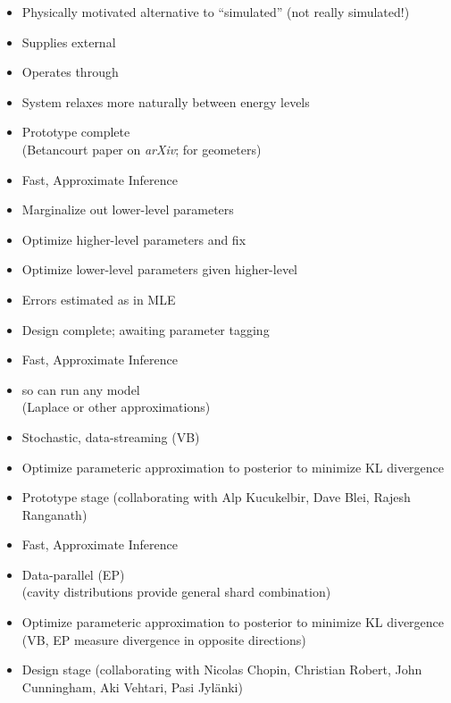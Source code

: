 \documentclass[10pt]{report}
\newcommand{\sld}[1]{\newpage{\noindent\LARGE \ \ \
    \textcolor{MidnightBlue}{\bfseries #1}}\vspace*{4pt}}
\newcommand{\myemph}[1]{{\color{MidnightBlue}{\bfseries #1}}}
\begin{document}
\sld{Adiabatic Sampling}
\begin{itemize}
\item Physically motivated alternative to ``simulated''
  \myemph{annealing and tempering} (not really simulated!)
\item Supplies external \myemph{heat bath}
\item Operates through \myemph{contact manifold}
\item System relaxes more naturally between energy levels
  \vfill
\item Prototype complete
  \\ {\small (Betancourt paper on {\slshape arXiv}; for geometers)}
\end{itemize}

\sld{Maximum Marginal Likelihood}
\begin{itemize}
\item Fast, Approximate Inference
\item Marginalize out lower-level parameters
\item Optimize higher-level parameters and fix
\item Optimize lower-level parameters given higher-level
\item Errors estimated as in MLE
  \vfill
\item Design complete; awaiting parameter tagging
\end{itemize}

\sld{``Black Box'' VB}
\begin{itemize}
\item Fast, Approximate Inference
\item \myemph{Black box} so can run any model
  \\
  {\footnotesize (Laplace or other approximations)}
\item Stochastic, data-streaming \myemph{variational Bayes} (VB)
\item Optimize parameteric approximation to posterior to minimize KL
  divergence 
  \vfill
\item Prototype stage (collaborating with Alp Kucukelbir, Dave Blei,
  Rajesh Ranganath)
\end{itemize}

\sld{``Black Box'' EP}
\begin{itemize}
\item Fast, Approximate Inference
\item Data-parallel \myemph{expectation propagation} (EP)
  \\ {\footnotesize (cavity distributions provide general shard combination)}
\item Optimize parameteric approximation to posterior to minimize KL
  divergence 
  {\footnotesize (VB, EP measure divergence in opposite directions)}
  \vfill
  \vfill
\item Design stage (collaborating with Nicolas Chopin, Christian
  Robert, John Cunningham, Aki Vehtari, Pasi Jyl\"anki)
\end{itemize}
\end{document}
